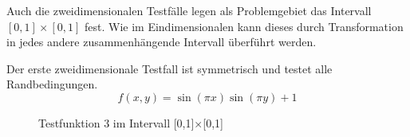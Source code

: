 Auch die zweidimensionalen Testfälle legen als Problemgebiet das Intervall
$[0,1]\times[0,1]$ fest. Wie im Eindimensionalen kann dieses durch Transformation
in jedes andere zusammenhängende Intervall überführt werden.

Der erste zweidimensionale Testfall ist symmetrisch und testet alle
Randbedingungen.
\begin{equation}
f(x,y) = \sin(\pi x) \sin(\pi y) + 1
\end{equation}

\begin{figure}[h]
\centering
\begin{subfigure}[b]{.5\linewidth}
\centering
{}
\end{subfigure}%
\begin{subfigure}[b]{.5\linewidth}
\centering
{}
\end{subfigure}
\caption{Testfunktion 3 im Intervall [0,1]$\times$[0,1]}\label{fig:tf3}
\end{figure}

